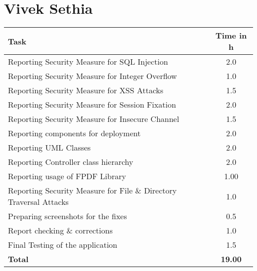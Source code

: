\section{Vivek Sethia}
\begin{table}[H]
\tiny
\begin{tabular*}{\textwidth}{@{\extracolsep{\fill}} l c@{\extracolsep{0pt}} }
\textbf{Task} & \textbf{Time in h} \\ \hline
Reporting Security Measure for SQL Injection & 2.0 \\
Reporting Security Measure for Integer Overflow  & 1.0 \\
Reporting Security Measure for XSS Attacks & 1.5 \\
Reporting Security Measure for Session Fixation  & 2.0 \\
Reporting Security Measure for Insecure Channel  & 1.5 \\
Reporting components for deployment & 2.0 \\
Reporting UML Classes & 2.0 \\
Reporting Controller class hierarchy & 2.0 \\
Reporting usage of FPDF Library & 1.00 \\
Reporting Security Measure for File \& Directory Traversal Attacks & 1.0 \\
Preparing screenshots for the fixes & 0.5 \\
Report checking \& corrections & 1.0 \\
Final Testing of the application & 1.5 \\
\hline\hline
\textbf{Total}								& \textbf{19.00}
\end{tabular*}
\end{table}
\clearpage

